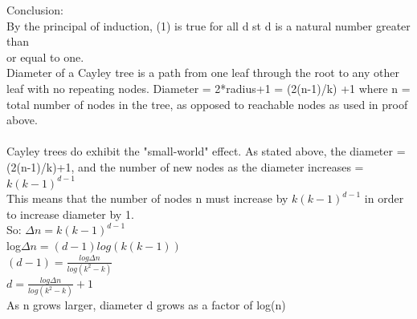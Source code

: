 \documentclass[11pt, oneside]{article}   	%
\begin{document}
\justify
Conclusion:\\
\indent
By the principal of induction, (1) is true for all d st d is a natural number greater than\\
\indent or equal to one.\\
\justify
Diameter of a Cayley tree is a path from one leaf through the root to any other leaf with no repeating nodes.  Diameter = 2*radius+1 = (2(n-1)/k) +1 where n = total number of nodes in the tree, as opposed to reachable nodes as used in proof above.\\
\\
Cayley trees do exhibit the "small-world" effect. As stated above, the diameter = (2(n-1)/k)+1, and the number of new nodes as the diameter increases = $k(k-1)^{d-1}$\\
This means that the number of nodes n must increase by $k(k-1)^{d-1}$ in order to increase diameter by 1.  \\
So: $\Delta n = k(k-1)^{d-1}$\\
\indent log$\Delta n = (d-1)log(k(k-1))$\\
\indent $(d-1) = \frac{log \Delta n}{log(k^2 - k)}$\\
\indent $d = \frac{log \Delta n}{log(k^2 - k)} + 1$\\
As n grows larger, diameter d grows as a factor of log(n)\\
\\
\end{document}
